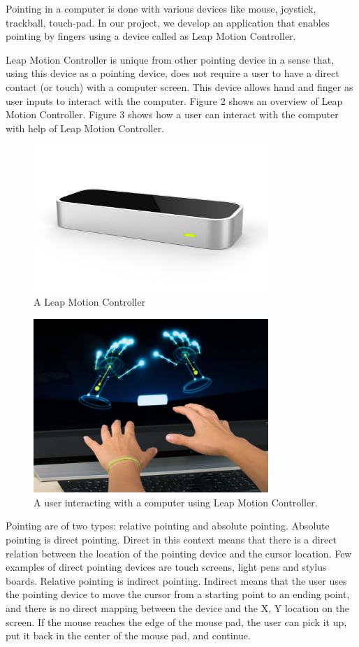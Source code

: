 \documentclass[titlepage]{article}
\begin{document}
Pointing in a computer is done with various devices like mouse, joystick, trackball, touch-pad. In our project, we develop an application that enables pointing by fingers using a device called as Leap Motion Controller.

Leap Motion Controller is unique from other pointing device in a sense that, using this device as a pointing device, does not require a user to have a direct contact (or touch) with a computer screen. This device allows hand and finger as user inputs to interact with the computer. Figure 2 shows an overview of Leap Motion Controller. Figure 3 shows how a user can interact with the computer with help of Leap Motion Controller.

\begin{figure}[!h]
\centering
\includegraphics[width=3.5in]{Figure_2}
\caption{A Leap Motion Controller}
\end{figure}

\begin{figure}[!h]
\centering
\includegraphics[width=3.5in]{Figure_3}
\caption{A user interacting with a computer using Leap Motion Controller.}
\end{figure}

Pointing are of two types: relative pointing and absolute pointing. Absolute pointing \cite{1} is direct pointing. Direct in this context means that there is a direct relation between the location of the pointing device and the cursor location. Few examples of direct pointing devices are touch screens, light pens and stylus boards. Relative pointing \cite{1} is indirect pointing. Indirect means that the user uses the pointing device to move the cursor from a starting point to an ending point, and there is no direct mapping between the device and the X, Y location on the screen. If the mouse reaches the edge of the mouse pad, the user can pick it up, put it back in the center of the mouse pad, and continue.   
\end{document}
